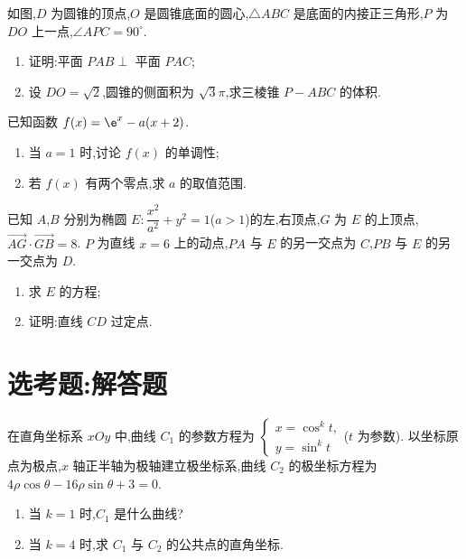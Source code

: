 \begin{problem}
如图,\(D\) 为圆锥的顶点,\(O\) 是圆锥底面的圆心,\(\triangle ABC\) 是底面的内接正三角形,\(P\) 为 \(DO\) 上一点,\(\angle APC=90^{\circ}\).

\begin{enumerate}
\item 证明:平面 \(PAB\perp\) 平面 \(PAC\);

\item 设 \(DO=\sqrt{2}\),圆锥的侧面积为 \(\sqrt{3}\pi\),求三棱锥 \(P-ABC\) 的体积.
\end{enumerate}

\end{problem}

\begin{problem}
已知函数 \(f(x)=\e^x-a(x+2)\).

\begin{enumerate}
\item 当 \(a=1\) 时,讨论 \(f(x)\) 的单调性;

\item 若 \(f(x)\) 有两个零点,求 \(a\) 的取值范围.
\end{enumerate}
\end{problem}

\begin{problem}
已知 \(A\),\(B\) 分别为椭圆 \(E:\dfrac{x^2}{a^2}+y^2=1\)(\(a>1\))的左,右顶点,\(G\) 为 \(E\) 的上顶点,\(\overrightarrow{AG}\cdot\overrightarrow{GB}=8\). \(P\) 为直线 \(x=6\) 上的动点,\(PA\) 与 \(E\) 的另一交点为 \(C\),\(PB\) 与 \(E\) 的另一交点为 \(D\).

\begin{enumerate}
\item 求 \(E\) 的方程;

\item 证明:直线 \(CD\) 过定点.
\end{enumerate}
\end{problem}

\section{选考题:解答题}

\begin{problem}
在直角坐标系 \(xOy\) 中,曲线 \(C_1\) 的参数方程为 \(\begin{cases}
x=\cos^k t,\\
y=\sin^k t
\end{cases}\)(\(t\) 为参数). 以坐标原点为极点,\(x\) 轴正半轴为极轴建立极坐标系,曲线 \(C_2\) 的极坐标方程为 \(4\rho\cos\theta-16\rho\sin\theta+3=0\).

\begin{enumerate}
\item 当 \(k=1\) 时,\(C_1\) 是什么曲线?

\item 当 \(k=4\) 时,求 \(C_1\) 与 \(C_2\) 的公共点的直角坐标.
\end{enumerate}
\end{problem}

